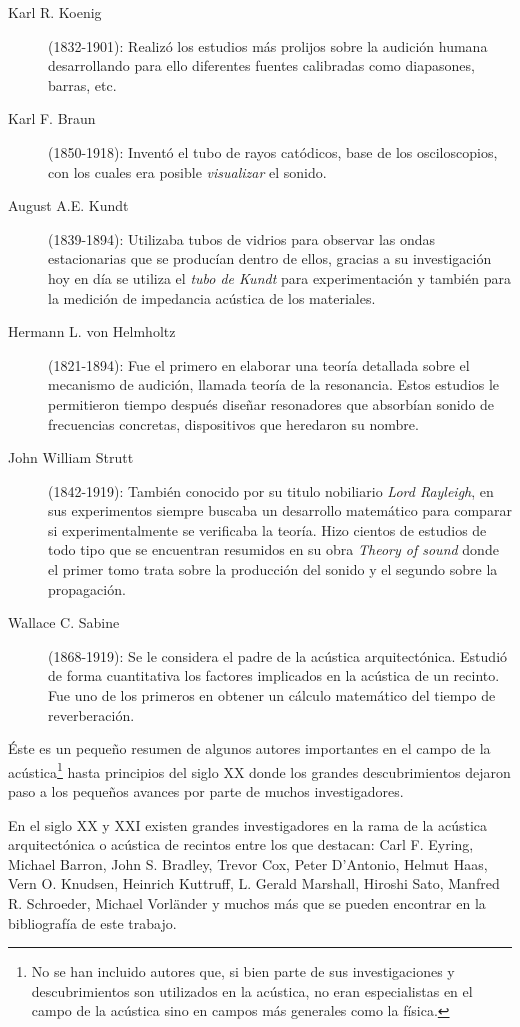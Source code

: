 \begin{description}
  \item[Karl R. Koenig](1832-1901): Realizó los estudios más prolijos sobre la audición humana desarrollando para ello diferentes fuentes calibradas como diapasones, barras, etc.
  \item[Karl F. Braun](1850-1918): Inventó el tubo de rayos catódicos, base de los osciloscopios, con los cuales era posible \textit{visualizar} el sonido.
  \item[August A.E. Kundt](1839-1894): Utilizaba tubos de vidrios para observar las ondas estacionarias que se producían dentro de ellos, gracias a su investigación \citep{Kundt1866} hoy en día se utiliza el \textit{tubo de Kundt} para experimentación y también para la medición de impedancia acústica de los materiales.
  \item[Hermann L. von Helmholtz](1821-1894): Fue el primero en elaborar una teoría detallada sobre el mecanismo de audición, llamada teoría de la resonancia. Estos estudios le permitieron tiempo después diseñar resonadores que absorbían sonido de frecuencias concretas, dispositivos que heredaron su nombre.
  \item[John William Strutt](1842-1919): También conocido por su titulo nobiliario \textit{Lord Rayleigh}, en sus experimentos siempre buscaba un desarrollo matemático para comparar si experimentalmente se verificaba la teoría. Hizo cientos de estudios de todo tipo que se encuentran resumidos en su obra \textit{Theory of sound} donde el primer tomo trata sobre la producción del sonido y el segundo sobre la propagación.
  \item[Wallace C. Sabine](1868-1919): Se le considera el padre de la acústica arquitectónica. Estudió de forma cuantitativa los factores implicados en la acústica de un recinto. Fue uno de los primeros en obtener un cálculo matemático del tiempo de reverberación.
  \end{description}
  
Éste es un pequeño resumen de algunos autores importantes en el campo de la acústica\footnote{No se han incluido autores que, si bien parte de sus investigaciones y descubrimientos son utilizados en la acústica, no eran especialistas en el campo de la acústica sino en campos más generales como la física.} hasta principios del siglo XX donde los grandes descubrimientos dejaron paso a los pequeños avances por parte de muchos investigadores.
  
En el siglo XX y XXI existen grandes investigadores en la rama de la acústica arquitectónica o acústica de recintos entre los que destacan: Carl F. Eyring, Michael Barron, John S. Bradley, Trevor Cox, Peter D'Antonio, Helmut Haas, Vern O. Knudsen, Heinrich Kuttruff, L. Gerald Marshall, Hiroshi Sato, Manfred R. Schroeder, Michael Vorländer y muchos más que se pueden encontrar en la bibliografía de este trabajo. 
  
